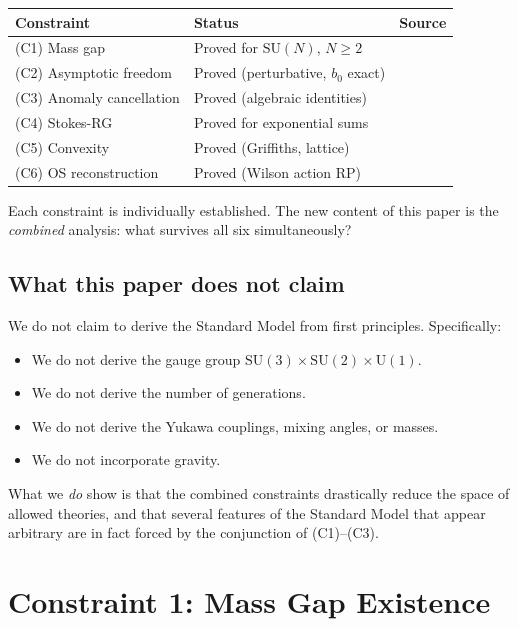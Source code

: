 \documentclass[12pt]{article}
\theoremstyle{definition}
\theoremstyle{remark}
\newcommand{\SU}{\mathrm{SU}}
\newcommand{\UU}{\mathrm{U}}
\begin{document}
\begin{center}
\renewcommand{\arraystretch}{1.3}
\begin{tabular}{lll}
\toprule
Constraint & Status & Source \\
\midrule
(C1) Mass gap & Proved for $\SU(N)$, $N \geq 2$ & \cite{Olbryk2026MG} \\
(C2) Asymptotic freedom & Proved (perturbative, $b_0$ exact) & \cite{GrossWilczek1973,Politzer1973} \\
(C3) Anomaly cancellation & Proved (algebraic identities) & \cite{BIM1972,GrossJackiw1972} \\
(C4) Stokes-RG & Proved for exponential sums & \cite{OlbrykPsi2026} \\
(C5) Convexity & Proved (Griffiths, lattice) & \cite{Griffiths1972,Simon1993} \\
(C6) OS reconstruction & Proved (Wilson action RP) & \cite{OS73,OS75,Olbryk2026MG} \\
\bottomrule
\end{tabular}
\end{center}

Each constraint is individually established.  The new content
of this paper is the \emph{combined} analysis: what survives
all six simultaneously?

\subsection{What this paper does not claim}

We do not claim to derive the Standard Model from first principles.
Specifically:
\begin{itemize}
\item We do not derive the gauge group
  $\SU(3) \times \SU(2) \times \UU(1)$.
\item We do not derive the number of generations.
\item We do not derive the Yukawa couplings, mixing angles,
  or masses.
\item We do not incorporate gravity.
\end{itemize}
What we \emph{do} show is that the combined constraints drastically
reduce the space of allowed theories, and that several features of
the Standard Model that appear arbitrary are in fact forced by the
conjunction of (C1)--(C3).

\section{Constraint 1: Mass Gap Existence}
\label{sec:massgap}
\end{document}

